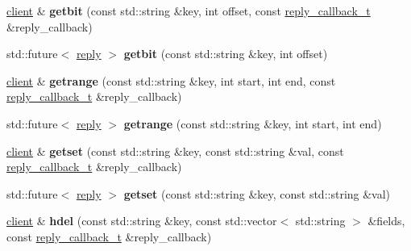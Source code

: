 \begin{DoxyCompactItemize}
\hyperlink{classcpp__redis_1_1client}{client} \& {\bfseries getbit} (const std\+::string \&key, int offset, const \hyperlink{classcpp__redis_1_1client_a061a1140d36d2eaeda82b09a0bb3f9f2}{reply\+\_\+callback\+\_\+t} \&reply\+\_\+callback)
\item 
\mbox{\label{classcpp__redis_1_1client_a43caae473008353b5ddc74a8fb36298c}} 
std\+::future$<$ \hyperlink{classcpp__redis_1_1reply}{reply} $>$ {\bfseries getbit} (const std\+::string \&key, int offset)
\item 
\mbox{\label{classcpp__redis_1_1client_a28b3fe6983918c6fc5549f1310742df1}} 
\hyperlink{classcpp__redis_1_1client}{client} \& {\bfseries getrange} (const std\+::string \&key, int start, int end, const \hyperlink{classcpp__redis_1_1client_a061a1140d36d2eaeda82b09a0bb3f9f2}{reply\+\_\+callback\+\_\+t} \&reply\+\_\+callback)
\item 
\mbox{\label{classcpp__redis_1_1client_a3a0ed59f7fc32ba22c1a9be3c02e5468}} 
std\+::future$<$ \hyperlink{classcpp__redis_1_1reply}{reply} $>$ {\bfseries getrange} (const std\+::string \&key, int start, int end)
\item 
\mbox{\label{classcpp__redis_1_1client_a124dca021c3aedd3f8cbb52263e7fec8}} 
\hyperlink{classcpp__redis_1_1client}{client} \& {\bfseries getset} (const std\+::string \&key, const std\+::string \&val, const \hyperlink{classcpp__redis_1_1client_a061a1140d36d2eaeda82b09a0bb3f9f2}{reply\+\_\+callback\+\_\+t} \&reply\+\_\+callback)
\item 
\mbox{\label{classcpp__redis_1_1client_abcbf060105acb8b1d7b14a5102be19a0}} 
std\+::future$<$ \hyperlink{classcpp__redis_1_1reply}{reply} $>$ {\bfseries getset} (const std\+::string \&key, const std\+::string \&val)
\item 
\mbox{\label{classcpp__redis_1_1client_adc62af1a2d07d04fbf274f98f374ab47}} 
\hyperlink{classcpp__redis_1_1client}{client} \& {\bfseries hdel} (const std\+::string \&key, const std\+::vector$<$ std\+::string $>$ \&fields, const \hyperlink{classcpp__redis_1_1client_a061a1140d36d2eaeda82b09a0bb3f9f2}{reply\+\_\+callback\+\_\+t} \&reply\+\_\+callback)
\item 

\end{DoxyCompactItemize}
